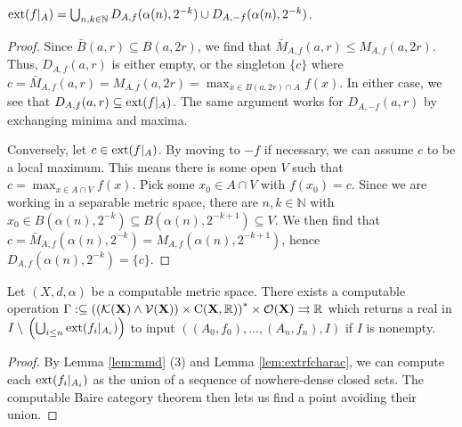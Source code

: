 \documentclass{eptcs-modified}
\begin{document}
\begin{lemma}
\label{lem:extrfcharac}
$\mathrm{ext}(f|_{A}) = \bigcup_{n, k \in \mathbb{N}} D_{A,f}(\alpha(n), 2^{-k}) \cup D_{A,-f}(\alpha(n), 2^{-k})$.
\begin{proof}
Since $\bar{B}(a, r) \subseteq B(a, 2r) $, we find that $\bar{M}_{A,f}(a, r) \leq M_{A,f}(a, 2r)$. Thus, $D_{A,f}(a, r)$ is either empty, or the singleton $\{c\}$ where $c = \bar{M}_{A,f}(a, r) = M_{A,f}(a, 2r) = \max_{x \in B(a,2r) \cap A} f(x)$. In either case, we see that $D_{A,f}(a, r) \subseteq \mathrm{ext}(f|_{A})$. The same argument works for $D_{A,-f}(a, r)$ by exchanging minima and maxima.

Conversely, let $c \in \mathrm{ext}(f|_{A})$. By moving to $-f$ if necessary, we can assume $c$ to be a local maximum. This means there is some open $V$ such that $c = \max_{x \in A \cap V} f(x)$. Pick some $x_0 \in A \cap V$ with $f(x_0) = c$. Since we are working in a separable metric space, there are $n ,k \in \mathbb{N}$ with $x_0 \in B(\alpha(n),2^{-k}) \subseteq B(\alpha(n),2^{-k+1}) \subseteq V$. We then find that $c = \bar{M}_{A,f}(\alpha(n), 2^{-k}) = M_{A,f}(\alpha(n), 2^{-k+1})$, hence $D_{A,f}(\alpha(n),2^{-k}) = \{c\}$.
\end{proof}
\end{lemma}


\begin{lemma}\label{lemma1}
  Let $(X,d,\alpha)$ be a computable metric space.
There exists a computable operation $\Gamma :\subseteq \left ((\mathcal{K}(\mathbf{X}) \wedge  \mathcal{V}(\mathbf{X})) \times
\textrm{C}(\mathbf{X}, \mathbb{R})\right )^* \times \mathcal{O}(\mathbf{X})  \rightrightarrows \mathbb{R}$ which returns a real in
$I \setminus\, \left (\bigcup_{i \leq n} \mathrm{ext}(f_i|_{A_i}) \right )$ to input $((A_0, f_0),\ldots,(A_n,f_n), I)$ if $I$ is nonempty.
\end{lemma}

\begin{proof}
By Lemma \ref{lem:mmd} (3) and Lemma \ref{lem:extrfcharac}, we can compute each $\mathrm{ext}(f_i|_{A_i})$ as the union of a sequence of nowhere-dense closed sets. The computable Baire category theorem then lets us find a point avoiding their union.
\end{proof}
\end{document}
